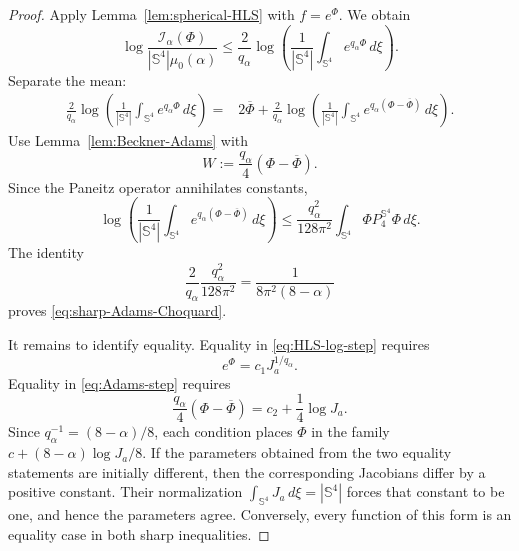 \documentclass[11pt]{article}
\numberwithin{equation}{section}
\begin{document}
\begin{proof}
Apply Lemma~\ref{lem:spherical-HLS} with \(f=e^{\Phi}\). We obtain
\begin{equation}\label{eq:HLS-log-step}
\log\frac{\mathcal I_{\alpha}(\Phi)}{|\mathbb S^{4}|\mu_{0}(\alpha)}
\leq\frac{2}{q_{\alpha}}
\log\left(\frac{1}{|\mathbb S^{4}|}
\int_{\mathbb S^{4}}e^{q_{\alpha}\Phi}\,d\xi\right).
\end{equation}
Separate the mean:
\begin{equation*}
\begin{aligned}
\frac{2}{q_{\alpha}}
\log\left(\frac{1}{|\mathbb S^{4}|}
\int_{\mathbb S^{4}}e^{q_{\alpha}\Phi}\,d\xi\right)
={}&2\overline\Phi+\frac{2}{q_{\alpha}}
\log\left(\frac{1}{|\mathbb S^{4}|}
\int_{\mathbb S^{4}}e^{q_{\alpha}(\Phi-\overline\Phi)}\,d\xi\right).
\end{aligned}
\end{equation*}
Use Lemma~\ref{lem:Beckner-Adams} with
\begin{equation*}
W:=\frac{q_{\alpha}}{4}(\Phi-\overline\Phi).
\end{equation*}
Since the Paneitz operator annihilates constants,
\begin{equation}\label{eq:Adams-step}
\log\left(\frac{1}{|\mathbb S^{4}|}
\int_{\mathbb S^{4}}e^{q_{\alpha}(\Phi-\overline\Phi)}\,d\xi\right)
\leq\frac{q_{\alpha}^{2}}{128\pi^{2}}
\int_{\mathbb S^{4}}\Phi P_{4}^{\mathbb S^{4}}\Phi\,d\xi.
\end{equation}
The identity
\begin{equation*}
\frac{2}{q_{\alpha}}\frac{q_{\alpha}^{2}}{128\pi^{2}}
=\frac{1}{8\pi^{2}(8-\alpha)}
\end{equation*}
proves \eqref{eq:sharp-Adams-Choquard}.

It remains to identify equality. Equality in \eqref{eq:HLS-log-step} requires
\begin{equation*}
e^{\Phi}=c_{1}J_{a}^{1/q_{\alpha}}.
\end{equation*}
Equality in \eqref{eq:Adams-step} requires
\begin{equation*}
\frac{q_{\alpha}}{4}(\Phi-\overline\Phi)
=c_{2}+\frac14\log J_{a}.
\end{equation*}
Since \(q_{\alpha}^{-1}=(8-\alpha)/8\), each condition places
\(\Phi\) in the family
\(c+(8-\alpha)\log J_a/8\). If the parameters obtained from the two
equality statements are initially different, then the corresponding
Jacobians differ by a positive constant. Their normalization
\(\int_{\mathbb S^{4}}J_a\,d\xi=|\mathbb S^{4}|\) forces that constant
to be one, and hence the parameters agree. Conversely, every function of this
form is an equality case in both sharp inequalities.
\end{proof}
\end{document}
